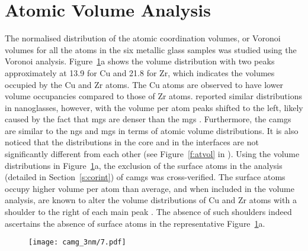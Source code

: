\section{Atomic Volume Analysis} \label{s:atvolcamg}
\begin{changebar}
The normalised distribution of the atomic coordination volumes, or Voronoi volumes \cite{Cheng2019,Lu2018} for all the atoms in the six metallic glass samples was studied using the Voronoi analysis. Figure~\ref{f:vol_camg}a shows the volume distribution with two peaks approximately at 13.9 \acu for Cu and 21.8 \acu for Zr, which indicates the volumes occupied by the Cu and Zr atoms. The Cu atoms are observed to have lower volume occupancies compared to those of Zr atoms. \textcite{Cheng2019} reported similar distributions in \czsix nanoglasses, however, with the volume per atom peaks shifted to the left, likely caused by the fact that \czsix \gls{mg}s are denser than the \cz \gls{mg}s \cite{Li2008}. Furthermore, the \gls{camg}s are similar to the \gls{ng}s and \gls{mg}s in terms of atomic volume distributions. It is also noticed that the distributions in the core and in the interfaces are not significantly different from each other (see Figure~\ref{f:atvol} in ). Using the volume distributions in Figure~\ref{f:vol_camg}a, the exclusion of the surface atoms in the analysis (detailed in Section~\ref{s:corint}) of \gls{camg}s was cross-verified. The surface atoms occupy higher volume per atom than average, and when included in the volume analysis, are known to alter the volume distributions of Cu and Zr atoms with a shoulder to the right of each main peak \cite{Cheng2019}. The absence of such shoulders indeed ascertains the absence of surface atoms in the representative Figure~\ref{f:vol_camg}a. \par

\begin{figure}[!h] \centering
	\texttt{[image: camg\_3nm/7.pdf]}
	\label{f:vol_camg}
\end{figure}



\end{changebar}
